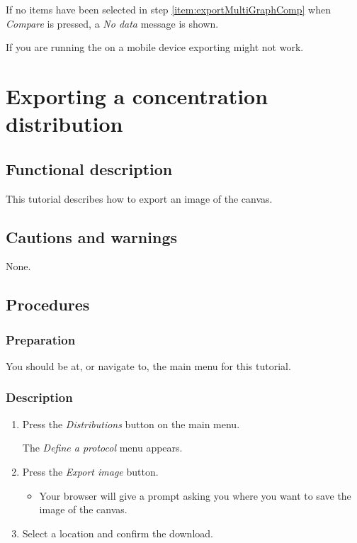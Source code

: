 If no items have been selected in step \ref{item:exportMultiGraphComp} when \emph{Compare} is pressed, a \emph{No data} message is shown.

If you are running the \applicationname{} on a mobile device exporting might not work.


\section{Exporting a concentration distribution}
\label{sec:exportDist}

\subsection{Functional description}
This tutorial describes how to export an image of the canvas.

\subsection{Cautions and warnings}
None.

\subsection{Procedures}
\subsubsection{Preparation}
You should be at, or navigate to, the main menu for this tutorial.

\subsubsection{Description}
\begin{enumerate}
	\item Press the \emph{Distributions} button on the main menu.
		\begin{itemize}
            The \emph{Define a protocol} menu appears.
		\end{itemize}
	\item Press the \emph{Export image} button.
		\begin{itemize}
            \item Your browser will give a prompt asking you where you want to save the image of the canvas.
		\end{itemize}
	\item  Select a location and confirm the download.
\end{enumerate}

